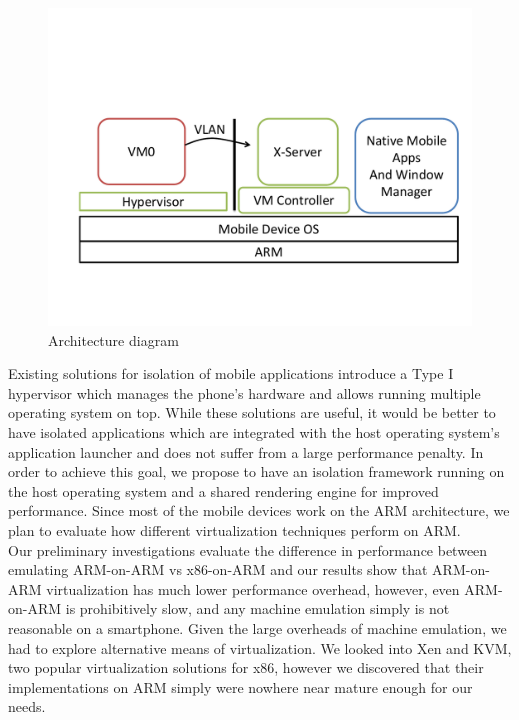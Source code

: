 \begin{figure}[tbh]
\centering
\includegraphics[width=1.5\columnwidth]{arch}
\caption{Architecture diagram}
\label{fig:arch}
\end{figure}
Existing solutions for isolation of mobile applications introduce a Type I hypervisor \cite{mvp, okl4} which manages the phone's hardware and allows running multiple operating system on top. While these solutions are useful, it would be better to have isolated applications which are integrated with the host operating system's application launcher and does not suffer from a large performance penalty. In order to achieve this goal, we propose to have an isolation framework running on the host operating system and a shared rendering engine for improved performance. Since most of the mobile devices work on the ARM architecture, we plan to evaluate how different virtualization techniques perform on ARM.\\

Our preliminary investigations evaluate the difference in performance between emulating ARM-on-ARM vs x86-on-ARM and our results show that ARM-on-ARM virtualization has much lower performance overhead, however, even ARM-on-ARM is prohibitively slow, and any machine emulation simply is not reasonable on a smartphone.  Given the large overheads of machine emulation, we had to explore alternative means of virtualization.  We looked into Xen and KVM, two popular virtualization solutions for x86, however we discovered that their implementations on ARM simply were nowhere near mature enough for our needs. \\

